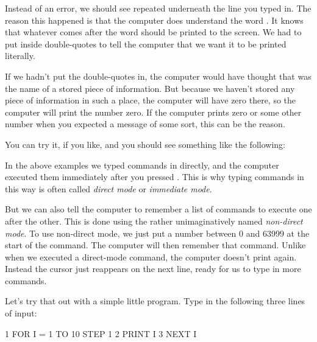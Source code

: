   Instead of an error, we should see  repeated underneath
  the line you typed in.  The reason this happened is that the computer
  does understand the word .  It knows that whatever comes after
  the word  should be printed to the screen.  We had to put  inside double-quotes to tell the computer that we want it to be
  printed literally.

  If we hadn't put the double-quotes in, the computer would have thought
  that  was the name of a stored piece of information.
  But because we haven't stored any piece of information in such a place,
  the computer will have zero there, so the computer will print the number
  zero. If the computer prints zero or some other number when
  you expected a message of some sort, this can be the reason.

\needspace{4cm} %
  You can try it, if you like, and you should see something like the following:


  In the above examples we typed commands in directly, and the computer executed
  them immediately after you pressed .  This is why
  typing commands in this way is often called {\em direct mode} or {\em immediate mode}.

  But we can also tell the computer to remember a list of commands to execute one
  after the other.   This is done using the rather unimaginatively named {\em non-direct mode}.
  To use non-direct mode, we just put a number between 0 and 63999 at the start of
  the command.  The computer will then remember that command.  Unlike when we executed
  a direct-mode command, the computer doesn't print  again. Instead the cursor
  just reappears on the next line, ready for us to type in more commands.

\needspace{4cm} %
  Let's try that out with a simple little program.  Type in the following three lines of
  input:

\begin{screenoutput}
1 FOR I = 1 TO 10 STEP 1
2 PRINT I
3 NEXT I
\end{screenoutput}


